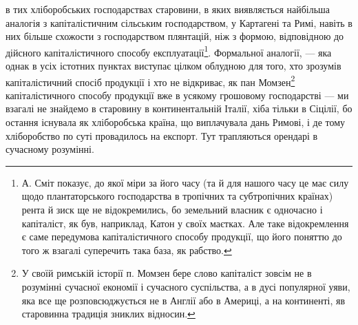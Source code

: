 \parcont{}  %
в тих хліборобських господарствах старовини, в яких виявляється найбільша
аналогія з капіталістичним сільським господарством, у Картагені та Римі,
навіть в них більше схожости з господарством плянтацій, ніж з формою, відповідною
до дійсного капіталістичного способу експлуатації\footnote{
А. Сміт показує, до якої міри за його часу (та й для нашого часу це має силу щодо
плантаторського господарства в тропічних та субтропічних країнах) рента й зиск ще не відокремились,
бо земельний власник є одночасно і капіталіст, як був, наприклад, Катон у своїх маєтках. Але таке
відокремлення є саме передумова капіталістичного способу продукції, що його поняттю до того ж
взагалі суперечить така база, як рабство.
}. Формальної аналогії,
— яка однак в усіх істотних пунктах виступає цілком облудною для того,
хто зрозумів капіталістичний спосіб продукції і хто не відкриває, як пан Момзен\footnote{
У своїй римській історії п. Момзен бере слово капіталіст зовсім не в розумінні сучасної економії
і сучасного суспільства, а в дусі популярної уяви, яка все ще розповсюджується не в Англії або в
Америці, а на континенті, яв старовинна традиція зниклих відносин.
}
капіталістичного способу продукції вже в усякому грошовому господарстві —
ми взагалі не знайдемо в старовину в континентальній Італії, хіба тільки в Сіцілії,
бо остання існувала як хліборобська країна, що виплачувала дань Римові,
і де тому хліборобство по суті провадилось на експорт. Тут трапляються орендарі
в сучасному розумінні.

